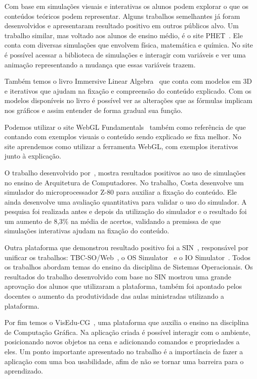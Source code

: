 \documentclass[tcc,capa]{texufpel}
\begin{document}
Com base em simulações visuais e interativas os alunos podem explorar o que os conteúdos teóricos podem representar. Alguns trabalhos semelhantes já foram desenvolvidos e apresentaram resultado positivo em outros públicos alvo. Um trabalho similar, mas voltado aos alunos de ensino médio, é o site PHET~\cite{phet_2002}. Ele conta com diversas simulações que envolvem física, matemática e química. No site é possível acessar a biblioteca de simulações e interagir com variáveis e ver uma animação representando a mudança que essas variáveis trazem. 

Também temos o livro Immersive Linear Algebra~\cite{strom2017immersive} que conta com modelos em 3D e iterativos que ajudam na fixação e compreensão do conteúdo explicado. Com os modelos disponíveis no livro é possível ver as alterações que as fórmulas implicam nos gráficos e assim entender de forma gradual sua função.

Podemos utilizar o site WebGL Fundamentals~\cite{webgl_2017} também como referência de que contando com exemplos visuais o conteúdo sendo explicado se fixa melhor. No site aprendemos como utilizar a ferramenta WebGL, com exemplos iterativos junto à explicação.

O trabalho desenvolvido por~\cite{costa2018incentivando}, mostra resultados positivos ao uso de simulações no ensino de Arquitetura de Computadores. No trabalho, Costa desenvolve um simulador do microprocessador Z-80 para auxiliar a fixação do conteúdo. Ele ainda desenvolve uma avaliação quantitativa para validar o uso do simulador. A pesquisa foi realizada antes e depois da utilização do simulador e o resultado foi um aumento de 8,3\% na média de acertos, validando a premissa de que simulações interativas ajudam na fixação do conteúdo.

Outra plataforma que demonstrou resultado positivo foi a SIN~\cite{SBIE1607}, responsável por unificar os trabalhos:  TBC-SO/Web~\cite{woodhull2000sistemas},  o  OS Simulator~\cite{gadelha2010simulator} e o IO Simulator~\cite{medeiros2011io}. Todos os trabalhos abordam temas do ensino da disciplina de Sistemas Operacionais. Os resultados do trabalho desenvolvido com base no SIN mostrou uma grande aprovação dos alunos que utilizaram a plataforma, também foi apontado pelos docentes o aumento da produtividade das aulas ministradas utilizando a plataforma.

Por fim temos o VisEdu-CG~\cite{montibeller2014visedu}, uma plataforma que auxilia o ensino na disciplina de Computação Gráfica. Na aplicação criada é possível interagir com o ambiente, posicionando novos objetos na cena e adicionando comandos e propriedades a eles. Um ponto importante apresentado no trabalho é a importância de fazer a aplicação com uma boa usabilidade, afim de não se tornar uma barreira para o aprendizado.
\end{document}
